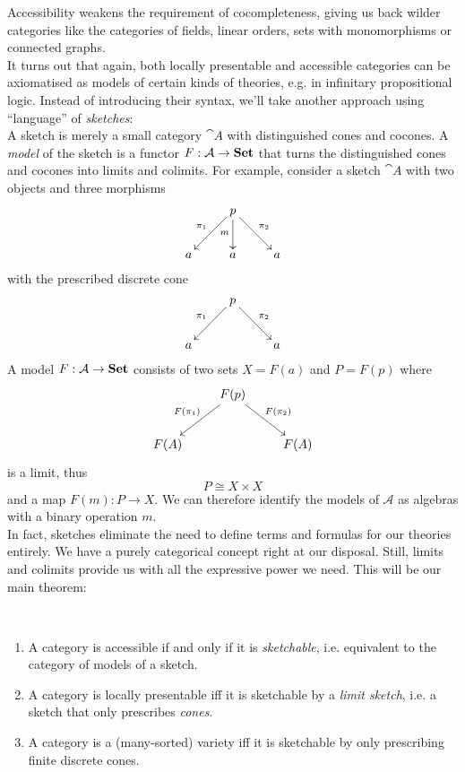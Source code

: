 Accessibility weakens the requirement of cocompleteness, giving us back wilder categories like the categories of fields, linear orders, sets with monomorphisms or connected graphs. \\

It turns out that again, both locally presentable and accessible categories can be axiomatised as models of certain kinds of theories, e.g. in infinitary propositional logic. Instead of introducing their syntax, we'll take another approach using ``language'' of \emph{sketches}: \\

A sketch is merely a small category $\cat A$ with distinguished cones and cocones. A \emph{model} of the sketch is a functor $F : \mathcal{A} \to \mathbf{Set}$ that turns the distinguished cones and cocones into limits and colimits. For example, consider a sketch $\cat A$ with two objects and three morphisms
\[
\xymatrix{
  & p \ar[rd]^{\pi_2} \ar[d]_{m} \ar[ld]_{\pi_1} & \\
a & a & a
}\]
with the prescribed discrete cone
\[
\xymatrix{
  & p \ar[rd]^{\pi_2} \ar[ld]_{\pi_1} & \\
a & & a
}\]
A model $F : \mathcal{A} \to \mathbf{Set}$ consists of two sets $X=F(a)$ and $P=F(p)$ where
\[
\xymatrix{
  & F(p) \ar[rd]^{F(\pi_2)} \ar[ld]_{F(\pi_1)} & \\
F(A) & & F(A)
}\]
is a limit, thus \[ P \cong X \times X \] 
and a map $F(m) : P \to X$. We can therefore identify the models of $\mathcal A$ as algebras with a binary operation $m$. \\

In fact, sketches eliminate the need to define terms and formulas for our theories entirely. We have a purely categorical concept right at our disposal. Still, limits and colimits provide us with all the expressive power we need. This will be our main theorem:

\begin{Theorem}[Sketchability]\
\begin{enumerate}
\item A category is accessible if and only if it is \emph{sketchable}, i.e. equivalent to the category of models of a sketch. 

\item A category is locally presentable iff it is sketchable by a \emph{limit sketch}, i.e. a sketch that only prescribes \emph{cones}.

\item A category is a (many-sorted) variety iff it is sketchable by only prescribing finite discrete cones.
\end{enumerate}
\end{Theorem}

